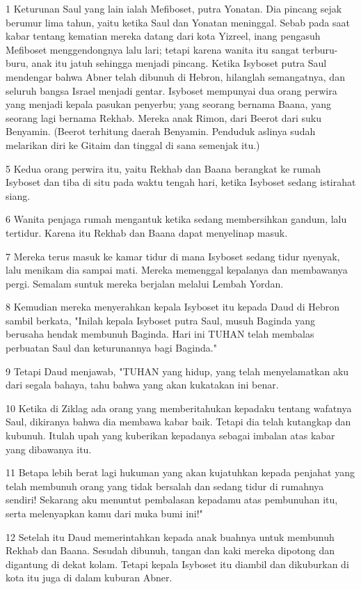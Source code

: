 \par 1 Keturunan Saul yang lain ialah Mefiboset, putra Yonatan. Dia pincang sejak berumur lima tahun, yaitu ketika Saul dan Yonatan meninggal. Sebab pada saat kabar tentang kematian mereka datang dari kota Yizreel, inang pengasuh Mefiboset menggendongnya lalu lari; tetapi karena wanita itu sangat terburu-buru, anak itu jatuh sehingga menjadi pincang. Ketika Isyboset putra Saul mendengar bahwa Abner telah dibunuh di Hebron, hilanglah semangatnya, dan seluruh bangsa Israel menjadi gentar. Isyboset mempunyai dua orang perwira yang menjadi kepala pasukan penyerbu; yang seorang bernama Baana, yang seorang lagi bernama Rekhab. Mereka anak Rimon, dari Beerot dari suku Benyamin. (Beerot terhitung daerah Benyamin. Penduduk aslinya sudah melarikan diri ke Gitaim dan tinggal di sana semenjak itu.)
\par 5 Kedua orang perwira itu, yaitu Rekhab dan Baana berangkat ke rumah Isyboset dan tiba di situ pada waktu tengah hari, ketika Isyboset sedang istirahat siang.
\par 6 Wanita penjaga rumah mengantuk ketika sedang membersihkan gandum, lalu tertidur. Karena itu Rekhab dan Baana dapat menyelinap masuk.
\par 7 Mereka terus masuk ke kamar tidur di mana Isyboset sedang tidur nyenyak, lalu menikam dia sampai mati. Mereka memenggal kepalanya dan membawanya pergi. Semalam suntuk mereka berjalan melalui Lembah Yordan.
\par 8 Kemudian mereka menyerahkan kepala Isyboset itu kepada Daud di Hebron sambil berkata, "Inilah kepala Isyboset putra Saul, musuh Baginda yang berusaha hendak membunuh Baginda. Hari ini TUHAN telah membalas perbuatan Saul dan keturunannya bagi Baginda."
\par 9 Tetapi Daud menjawab, "TUHAN yang hidup, yang telah menyelamatkan aku dari segala bahaya, tahu bahwa yang akan kukatakan ini benar.
\par 10 Ketika di Ziklag ada orang yang memberitahukan kepadaku tentang wafatnya Saul, dikiranya bahwa dia membawa kabar baik. Tetapi dia telah kutangkap dan kubunuh. Itulah upah yang kuberikan kepadanya sebagai imbalan atas kabar yang dibawanya itu.
\par 11 Betapa lebih berat lagi hukuman yang akan kujatuhkan kepada penjahat yang telah membunuh orang yang tidak bersalah dan sedang tidur di rumahnya sendiri! Sekarang aku menuntut pembalasan kepadamu atas pembunuhan itu, serta melenyapkan kamu dari muka bumi ini!"
\par 12 Setelah itu Daud memerintahkan kepada anak buahnya untuk membunuh Rekhab dan Baana. Sesudah dibunuh, tangan dan kaki mereka dipotong dan digantung di dekat kolam. Tetapi kepala Isyboset itu diambil dan dikuburkan di kota itu juga di dalam kuburan Abner.

